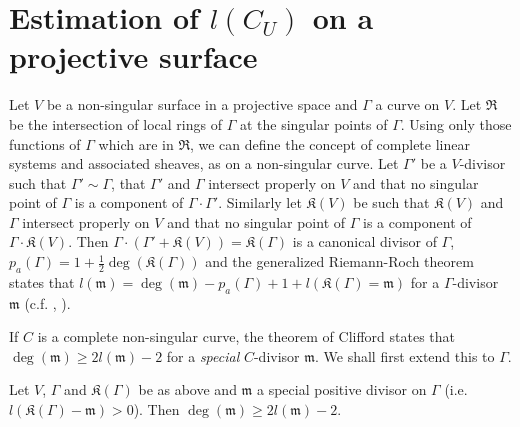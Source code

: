 \section{Estimation of $l(C_{U})$ on a projective surface}\label{art14-sec2}\pageoriginale

Let $V$ be a non-singular surface in a projective space and $\Gamma$ a curve on $V$. Let $\mathfrak{R}$ be the intersection of local rings of $\Gamma$ at the singular points of $\Gamma$. Using only those functions of $\Gamma$ which are in $\mathfrak{R}$, we can define the concept of complete linear systems and associated sheaves, as on a non-singular curve. Let $\Gamma'$ be a $V$-divisor such that $\Gamma'\sim \Gamma$, that $\Gamma'$ and $\Gamma$ intersect properly on $V$ and that no singular point of $\Gamma$ is a component of $\Gamma\cdot \Gamma'$. Similarly let $\mathfrak{K}(V)$ be such that $\mathfrak{K}(V)$ and $\Gamma$ intersect properly on $V$ and that no singular point of $\Gamma$ is a component of $\Gamma\cdot \mathfrak{K}(V)$. Then $\Gamma\cdot (\Gamma'+\mathfrak{K}(V))=\mathfrak{K}(\Gamma)$ is a canonical divisor of $\Gamma$, $p_{a}(\Gamma)=1+\frac{1}{2}\deg (\mathfrak{K}(\Gamma))$ and the generalized Riemann-Roch theorem states that $l(\mathfrak{m})=\deg (\mathfrak{m})-p_{a}(\Gamma)+1+l(\mathfrak{K}(\Gamma)=\mathfrak{m})$ for a $\Gamma$-divisor $\mathfrak{m}$ (c.f. \cite{art14-key20}, \cite{art14-key22}).

If $C$ is a complete non-singular curve, the theorem  of Clifford states that $\deg (\mathfrak{m})\geq 2l(\mathfrak{m})-2$ for a {\em special} $C$-divisor $\mathfrak{m}$. We shall first extend this to $\Gamma$.

\begin{lemma}\label{art14-lem2}
Let $V$, $\Gamma$ and $\mathfrak{K}(\Gamma)$ be as above and $\mathfrak{m}$ a special positive divisor on $\Gamma$ (i.e. $l(\mathfrak{K}(\Gamma)-\mathfrak{m})>0$). Then $\deg (\mathfrak{m})\geq 2l(\mathfrak{m})-2$.
\end{lemma}

